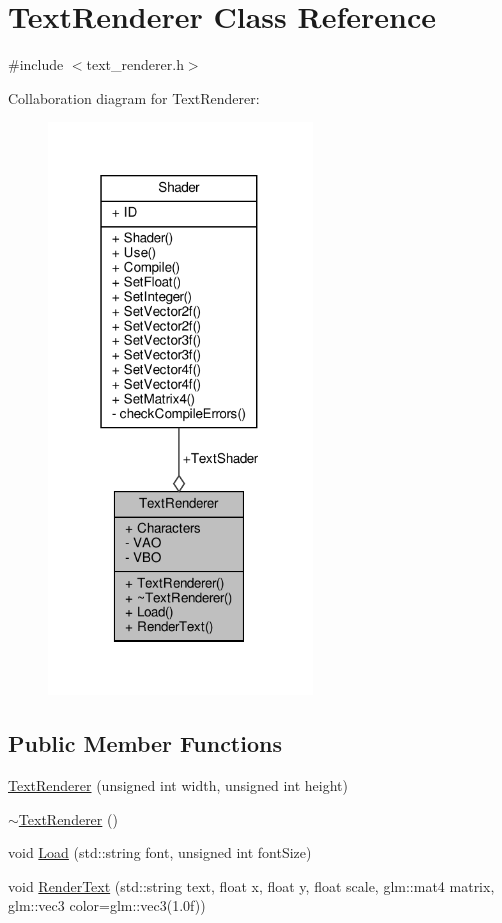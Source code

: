 \hypertarget{classTextRenderer}{}\section{Text\+Renderer Class Reference}
\label{classTextRenderer}


{\ttfamily \#include $<$text\+\_\+renderer.\+h$>$}



Collaboration diagram for Text\+Renderer\+:
\nopagebreak
\begin{figure}[H]
\begin{center}
\leavevmode
\includegraphics[width=199pt]{classTextRenderer__coll__graph}
\end{center}
\end{figure}
\subsection*{Public Member Functions}
\begin{DoxyCompactItemize}
\item 
\hyperlink{classTextRenderer_ac87978b0da75711662f6627190d5332a}{Text\+Renderer} (unsigned int width, unsigned int height)
\item 
\hyperlink{classTextRenderer_a7087505bdc31e41416408c27fe029f20}{$\sim$\+Text\+Renderer} ()
\item 
void \hyperlink{classTextRenderer_addf75e2c1eede12f9fcc465e83cec2d9}{Load} (std\+::string font, unsigned int font\+Size)
\item 
void \hyperlink{classTextRenderer_a2a206340f4c1c250bd79ebe3c7362135}{Render\+Text} (std\+::string text, float x, float y, float scale, glm\+::mat4 matrix, glm\+::vec3 color=glm\+::vec3(1.\+0f))
\end{DoxyCompactItemize}
